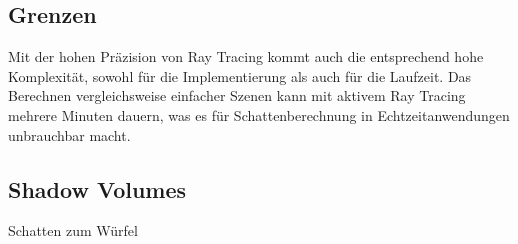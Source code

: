 \subsection*{Grenzen}

Mit der hohen Präzision von Ray Tracing kommt auch die entsprechend hohe Komplexität, sowohl für die
Implementierung als auch für die Laufzeit. Das Berechnen vergleichsweise einfacher Szenen kann mit
aktivem Ray Tracing mehrere Minuten dauern, was es für Schattenberechnung in Echtzeitanwendungen
unbrauchbar macht.

\subsection{Shadow Volumes}

Schatten zum Würfel
